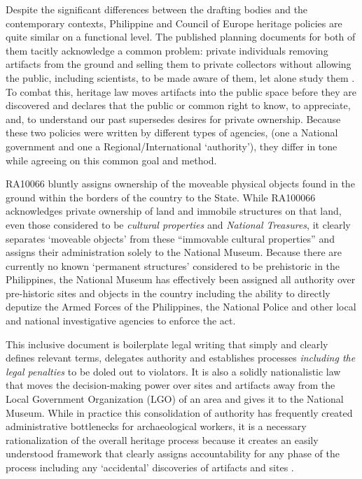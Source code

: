 \documentclass[english]{ijsra}
\begin{document}

Despite the significant differences between the drafting bodies and the contemporary contexts, Philippine and Council of Europe heritage policies are quite similar on a functional level. The published planning documents for both of them tacitly acknowledge a common problem: private individuals removing artifacts from the ground and selling them to private collectors without allowing the public, including scientists, to be made aware of them, let alone study them \parencites[2]{Valetta_1992}[18-20]{RA10066}. To combat this, heritage law moves artifacts into the public space before they are discovered and declares that the public or common right to know, to appreciate, and, to understand our past supersedes desires for private ownership. Because these two policies were written by different types of agencies, (one a National government and one a Regional/International ‘authority’), they differ in tone while agreeing on this common goal and method. 


RA10066 bluntly assigns ownership of the moveable physical objects found in the ground within the borders of the country to the State. While RA100066 acknowledges private ownership of land and immobile structures on that land, even those considered to be \textit{cultural properties} and \textit{National Treasures}, it clearly separates ‘moveable objects’ from these “immovable cultural properties” \parencite{RA10066} and assigns their administration solely to the National Museum. Because there are currently no known ‘permanent structures’ considered to be prehistoric in the Philippines, the National Museum has effectively been assigned all authority over pre-historic sites and objects in the country including the ability to directly deputize the Armed Forces of the Philippines, the National Police and other local and national investigative agencies to enforce the act. 

This inclusive document is boilerplate legal writing that simply and clearly defines relevant terms, delegates authority and establishes processes \textit{including the legal penalties} to be doled out to violators. 
It is also a solidly nationalistic law that moves the decision-making power over sites and artifacts away from the Local Government Organization (LGO) of an area and gives it to the National Museum. While in practice this consolidation of authority has frequently created administrative bottlenecks for archaeological workers, it is a necessary rationalization of the overall heritage process because it creates an easily understood framework that clearly assigns accountability for any phase of the process including any ‘accidental’ discoveries of artifacts and sites \parencite[8]{RA10066}.
\end{document}
